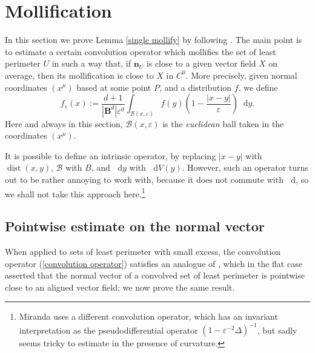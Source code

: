 \documentclass[reqno,11pt]{amsart}
\newcommand{\Ball}{\mathbf{B}}
\newcommand*\dif{\mathop{}\!\mathrm{d}}
\DeclareMathOperator{\dist}{dist}
\newcommand{\normal}{\mathbf n}
\theoremstyle{definition}
\numberwithin{equation}{section}
\begin{document}
\section{Mollification} \label{Mollifiers}
In this section we prove Lemma \ref{single mollify} by following \cite[Chapter 7]{Giusti77}.
The main point is to estimate a certain convolution operator which mollifies the set of least perimeter $U$ in such a way that, if $\normal_U$ is close to a given vector field $X$ on average, then its mollification is close to $X$ in $C^0$.
More precisely, given normal coordinates $(x^\mu)$ based at some point $P$, and a distribution $f$, we define 
\begin{equation}\label{convolution operator}
f_\varepsilon(x) := \frac{d + 1}{|\Ball^d| \varepsilon^d} \int_{\mathcal B(x, \varepsilon)} f(y) \left(1 - \frac{|x - y|}{\varepsilon}\right) \dif y.
\end{equation}
Here and always in this section, $\mathcal B(x, \varepsilon)$ is the \emph{euclidean} ball taken in the coordinates $(x^\mu)$.

It is possible to define an intrinsic operator, by replacing $|x - y|$ with $\dist(x, y)$, $\mathcal B$ with $B$, and $\dif y$ with $\dif V(y)$.
However, such an operator turns out to be rather annoying to work with, because it does not commute with $\dif$, so we shall not take this approach here.\footnote{Miranda \cite{Miranda66} uses a different convolution operator, which has an invariant interpretation as the pseudodifferential operator $(1 - \varepsilon^{-2} \Delta)^{-1}$, but sadly seems tricky to estimate in the presence of curvature.}

\subsection{Pointwise estimate on the normal vector}
When applied to sets of least perimeter with small excess, the convolution operator (\ref{convolution operator}) satisfies an analogue of \cite[Theorem 7.3]{Giusti77}, which in the flat case asserted that the normal vector of a convolved set of least perimeter is pointwise close to an aligned vector field; we now prove the same result.
\end{document}
